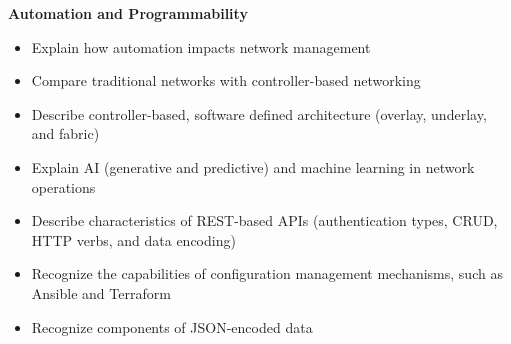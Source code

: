 \documentclass{article}
\begin{document}
\begin{flushleft}\textbf{Automation and Programmability}\end{flushleft}
\begin{itemize}
  \item Explain how automation impacts network management
  \item Compare traditional networks with controller-based networking
  \item Describe controller-based, software defined architecture (overlay, underlay, and fabric) 
  \item Explain AI (generative and predictive) and machine learning in network operations
  \item Describe characteristics of REST-based APIs (authentication types, CRUD, HTTP verbs, and data encoding)
  \item Recognize the capabilities of configuration management mechanisms, such as Ansible and Terraform
  \item Recognize components of JSON-encoded data\\
\end{itemize}
\end{document}
